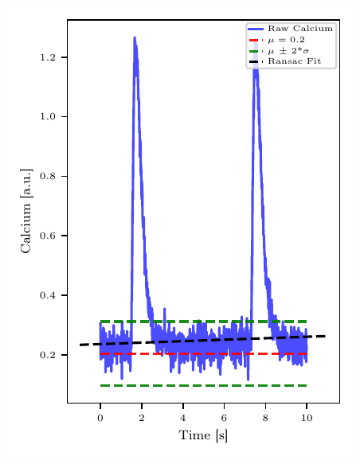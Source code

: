 \documentclass{report}
\begin{document}
    \begin{figure}[t]
                \centering
                 \begin{subfigure}[b]{0.4\textwidth}
                    \includegraphics[width=\textwidth, keepaspectratio]{plots/chapter_3/calc_ransac_fit.pdf}
                    \caption[Calcium Ransac Fit]{}
                    \label{fig:calc-ransac}
                \end{subfigure}
                ~
                \begin{subfigure}[b]{0.4\textwidth}

\end{subfigure}
\end{figure}
\end{document}
